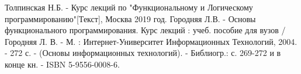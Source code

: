 \newpage
{}

\begin{thebibliography}{}
      Толпинская Н.Б.  -  Курс лекций по "Функциональному и Логическому программированию"[Текст], Москва 2019 год.
      Городняя Л.В.  -  Основы функционального программирования. Курс лекций : учеб. пособие для вузов / Городняя Л. В. - М. : Интернет-Университет Информационных Технологий, 2004. - 272 с. - (Основы информационных технологий). - Библиогр.: с. 269-272 и в конце кн. - ISBN 5-9556-0008-6.
\end{thebibliography}
